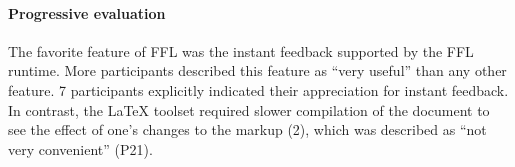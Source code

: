 



\paragraph{Progressive evaluation}

The favorite feature of FFL was the instant feedback supported by the FFL runtime. More participants described this feature as ``very useful'' than any other feature. 7 participants explicitly indicated their appreciation for instant feedback. In contrast, the LaTeX toolset required slower compilation of the document to see the effect of one's changes to the markup (2), which was described as ``not very convenient'' (P21).



